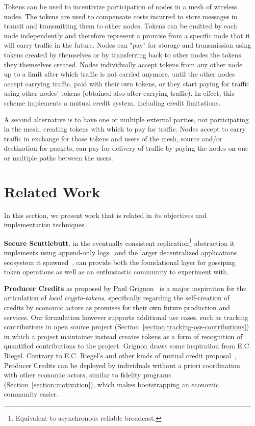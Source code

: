 \documentclass[sigconf,9pt]{acmart}
\begin{document}
Tokens can be used to incentivize participation of nodes in a mesh of wireless nodes. The tokens are used to compensate  costs incurred to store messages in transit and transmitting them to other nodes. Tokens can be emitted by each node independently and therefore represent a promise from a specific node that it will carry traffic in the future. Nodes can "pay" for storage and transmission using tokens created by themselves or by transferring back to other nodes the tokens they themselves created. Nodes individually accept tokens from any other node up to a limit after which traffic is not carried anymore, until the other nodes accept carrying traffic, paid with their own tokens, or they start paying for traffic using other nodes' tokens (obtained also after carrying traffic). In effect, this scheme implements a mutual credit system, including credit limitations.

A second alternative is to have one or multiple external parties, not participating in the mesh, creating tokens with which to pay for traffic. Nodes accept to carry traffic in exchange for those tokens and users of the mesh, source and/or destination for packets, can pay for delivery of traffic by paying the nodes on one or multiple paths between the users.

\section{Related Work}
\label{section:related-work}

In this section, we present work that is related in its objectives and implementation techniques.

\textbf{Secure Scuttlebutt}, in the eventually consistent replication\footnote{Equivalent to asynchronous reliable broadcast.} abstraction it implements using append-only logs~\cite{kermarrec2020gossiping} and the larger decentralized applications ecosystem it spawned~\cite{tarr2019ssb}, can provide both the foundational layer for gossiping token operations as well as an enthusiastic community to experiment with.

\textbf{Producer Credits} as proposed by Paul Grignon~\cite{producercredit} is a major inspiration for the articulation of \textit{local crypto-tokens}, specifically regarding the self-creation of credits by economic actors as promises for their own future production and services. Our formulation however supports additional use cases, such as tracking contributions in open source project (Section~\ref{section:tracking-oss-contributions}) in which a project maintainer instead creates tokens as a form of recognition of quantified contributions to the project. Grignon draws some inspiration from E.C. Riegel. Contrary to E.C. Riegel's and other kinds of mutual credit proposal~\cite{mutualcredit}, Producer Credits can be deployed by individuals without a priori coordination with other economic actors, similar to fidelity programs (Section~\ref{section:motivation}), which makes bootstrapping an economic community easier.
\end{document}
